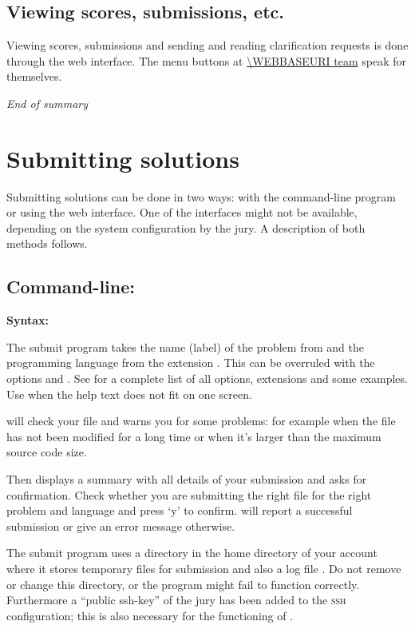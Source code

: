 \subsection*{Viewing scores, submissions, etc.}

Viewing scores, submissions and sending and reading clarification
requests is done through the web interface. The menu buttons at
\url{\WEBBASEURI team} speak for themselves.

\emph{End of summary}

\newpage
\tableofcontents
\newpage

\section{Submitting solutions}\label{submit}

Submitting solutions can be done in two ways: with the command-line
program  or using the web interface. One of the
interfaces might not be available, depending on the system
configuration by the jury. A description of both methods follows.

\subsection{Command-line: }

\textbf{Syntax:} 

The submit program takes the name (label) of the problem from
 and the programming language from the extension
. This can be overruled with the options
 and .
See  for a complete list of all options,
extensions and some examples.  Use 
when the help text does not fit on one screen.

 will check your file and warns you for some problems:
for example when the file has not been modified for a long time or
when it's larger than the maximum source code size.

Then  displays a summary with all details of your
submission and asks for confirmation. Check whether you are submitting
the right file for the right problem and language and press `y' to
confirm.  will report a successful submission or give
an error message otherwise.

The submit program uses a directory \cmd{\USERSUBMITDIR} in the
home directory of your account where it stores temporary files for
submission and also a log file . Do not remove or
change this directory, or the  program might fail to
function correctly. Furthermore a ``public ssh-key'' of the jury has
been added to the \textsc{ssh} configuration; this is also necessary
for the functioning of .

